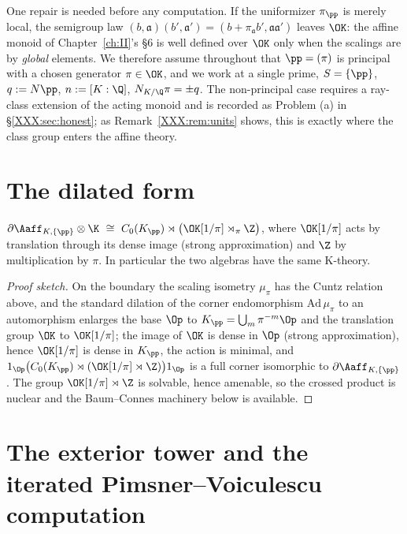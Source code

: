 One repair is needed before any computation. If the uniformizer $\pi_\pp$ is merely local,
the semigroup law $(b,\mathfrak a)(b',\mathfrak a')=(b+\pi_{\mathfrak a}b',\mathfrak
a\mathfrak a')$ leaves $\OK$: the affine monoid of Chapter~\ref{ch:II}'s \S6 is well defined over
$\OK$ only when the scalings are by \emph{global} elements. We therefore assume throughout
that $\pp=(\pi)$ is principal with a chosen generator $\pi\in\OK$, and we work at a single
prime, $S=\{\pp\}$, $q:=\Ns\pp$, $n:=[K:\Q]$, $\Ns_{K/\Q}\pi=\pm q$. The non-principal
case requires a ray-class extension of the acting monoid and is recorded as Problem (a) in
\S\ref{XXX:sec:honest}; as Remark~\ref{XXX:rem:units} shows, this is exactly where the class group
enters the affine theory.

\section{The dilated form}\label{XXX:sec:reduction}

\begin{proposition}\label{XXX:prop:dilation}
$\partial\Aaff_{K,\{\pp\}}\otimes\K\ \cong\
C_0(K_\pp)\rtimes\bigl(\OK[1/\pi]\rtimes_\pi\Z\bigr)$, where $\OK[1/\pi]$ acts by
translation through its dense image (strong approximation) and $\Z$ by multiplication by
$\pi$. In particular the two algebras have the same K-theory.
\end{proposition}

\begin{proof}[Proof sketch]
On the boundary the scaling isometry $\mu_\pi$ has the Cuntz relation above, and the
standard dilation of the corner endomorphism $\mathrm{Ad}\,\mu_\pi$ to an automorphism
enlarges the base $\Op$ to $K_\pp=\bigcup_m\pi^{-m}\Op$ and the translation group $\OK$ to
$\OK[1/\pi]$; the image of $\OK$ is dense in $\Op$ (strong approximation), hence
$\OK[1/\pi]$ is dense in $K_\pp$, the action is minimal, and
$1_{\Op}\bigl(C_0(K_\pp)\rtimes(\OK[1/\pi]\rtimes\Z)\bigr)1_{\Op}$ is a full corner
isomorphic to $\partial\Aaff_{K,\{\pp\}}$. The group $\OK[1/\pi]\rtimes\Z$ is solvable,
hence amenable, so the crossed product is nuclear and the Baum--Connes machinery below is
available.
\end{proof}

\section{The exterior tower and the iterated Pimsner--Voiculescu computation}\label{XXX:sec:pv}

